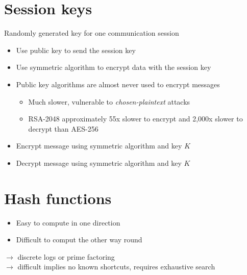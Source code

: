 \documentclass{easyclass}
\begin{document}
    \section{Session keys}
    \begin{definition}{}
        Randomly generated key for one communication session
    \end{definition}

    \begin{itemize}
        \item Use public key to send the session key
        \item Use symmetric algorithm to encrypt data with the session key
    \end{itemize}

    \begin{prf}[Security]{}
        \begin{itemize}
            \item Public key algorithms are almost never used to encrypt messages
            \begin{itemize}
                \item Much slower, vulnerable to \emph{chosen-plaintext} attacks
                \item RSA-2048 approximately 55x slower to encrypt and 2,000x slower to  decrypt than AES-256
            \end{itemize}
        \end{itemize}
    \end{prf}

    \begin{theo}{}
        \begin{itemize}
            \item Encrypt message using symmetric algorithm and key $K$
            \item Decrypt message using symmetric algorithm and key $K$
        \end{itemize}
        
    \end{theo}

    \section{Hash functions}
    \begin{itemize}
        \item Easy to compute in one direction
        \item Difficult to comput the other way round
    \end{itemize}
    $\rightarrow$ discrete logs or prime factoring \\
    $\rightarrow$ difficult implies no known shortcuts, requires exhaustive search
\end{document}
